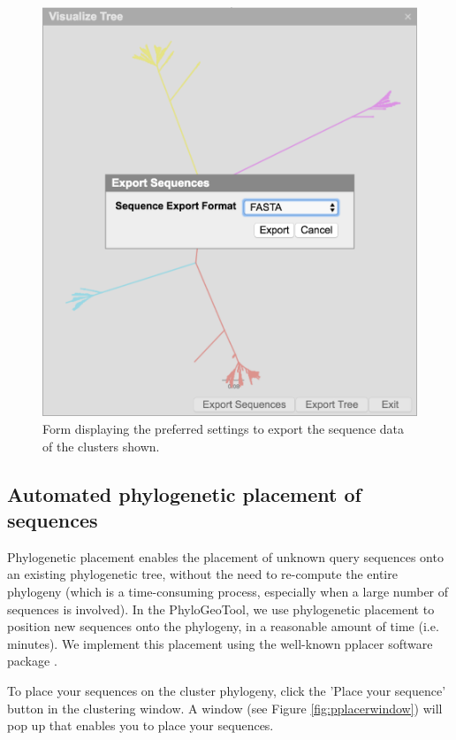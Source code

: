 \documentclass[a4paper, 11pt]{article} %
\begin{document}
\begin{figure}[H]
\centering
\includegraphics[scale=0.50]{images/exportsequences.PNG}
\vspace{-0.25cm}
\caption{Form displaying the preferred settings to export the sequence data of the clusters shown.}
\label{fig:export_sequences}
\end{figure}





 
\subsection{Automated phylogenetic placement of sequences}
Phylogenetic placement enables the placement of unknown query sequences onto an existing phylogenetic tree, without the need to re-compute the entire phylogeny (which is a time-consuming process, especially when a large number of sequences is involved). 
In the PhyloGeoTool, we use phylogenetic placement to position new sequences onto the phylogeny, in a reasonable amount of time (i.e. minutes). 
We implement this placement using the well-known pplacer software package \cite{Matsen2010}.

To place your sequences on the cluster phylogeny, click the 'Place your sequence' button in the clustering window. 
A window (see Figure \ref{fig:pplacerwindow}) will pop up that enables you to place your sequences. 
\end{document}
